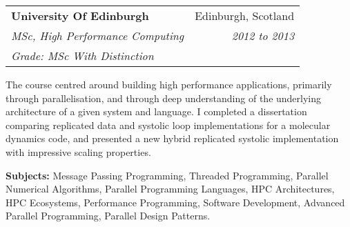 \documentclass[11pt]{article}
\makeatletter
\newenvironment{resumeSubSectionHeader}{
    \par
    \begin{tabular*}{\textwidth}{l@{\extracolsep{\fill}}r}
    \par
} {
    \end{tabular*}
    \par
}
\newenvironment{resumeSubSectionBody}{
    \par
    \vspace{-0.8\parskip}
    \begin{small}
    \par
} {
    \par
    \end{small}
    \par
}
\makeatother
\begin{document}
%
%
\begin{resumeSubSectionHeader}

    \textbf{University Of Edinburgh}       & Edinburgh, Scotland \\
    \emph{MSc, High Performance Computing} & \emph{2012 to 2013} \\
    \emph{Grade: MSc With Distinction}

\end{resumeSubSectionHeader}
\begin{resumeSubSectionBody}

    The course centred around building high performance applications,
    primarily through parallelisation, and through deep understanding
    of the underlying architecture of a given system and language.
    I completed a dissertation comparing replicated data and systolic loop
    implementations for a molecular dynamics code, and presented a new
    hybrid replicated systolic implementation with impressive scaling
    properties.

    \begin{description}
        \item{\bf Subjects:}
            Message Passing Programming, Threaded Programming,
            Parallel Numerical Algorithms,
            Parallel Programming Languages, HPC Architectures,
            HPC Ecosystems, Performance Programming,
            Software Development, Advanced Parallel Programming,
            Parallel Design Patterns.
    \end{description}

\end{resumeSubSectionBody}
\end{document}

